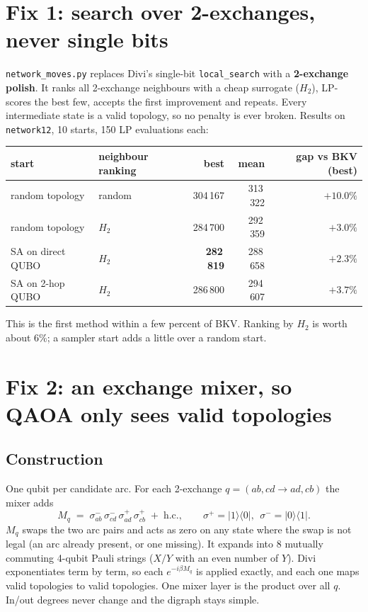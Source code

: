 \documentclass[11pt]{article}
\begin{document}
\section{Fix 1: search over 2-exchanges, never single bits}
\texttt{network\_moves.py} replaces Divi's single-bit \texttt{local\_search} with a
\textbf{2-exchange polish}. It ranks all 2-exchange neighbours with a cheap surrogate ($H_2$),
LP-scores the best few, accepts the first improvement and repeats. Every intermediate state
is a valid topology, so no penalty is ever broken. Results on \texttt{network12}, 10 starts,
150 LP evaluations each:
\begin{center}
\begin{tabular}{@{}llrrr@{}}
\toprule
start & neighbour ranking & best & mean & gap vs BKV (best)\\
\midrule
random topology & random & 304\,167 & 313\,322 & $+10.0\%$\\
random topology & $H_2$ & 284\,700 & 292\,359 & $+3.0\%$\\
SA on direct QUBO & $H_2$ & \textbf{282\,819} & 288\,658 & $\mathbf{+2.3\%}$\\
SA on 2-hop QUBO & $H_2$ & 286\,800 & 294\,607 & $+3.7\%$\\
\bottomrule
\end{tabular}
\end{center}
This is the first method within a few percent of BKV. Ranking by $H_2$ is worth about 6\%;
a sampler start adds a little over a random start.

\section{Fix 2: an exchange mixer, so QAOA only sees valid topologies}
\subsection{Construction}
One qubit per candidate arc. For each 2-exchange $q=(ab,cd\to ad,cb)$ the mixer adds
\[
  M_q \;=\; \sigma^-_{ab}\,\sigma^-_{cd}\,\sigma^+_{ad}\,\sigma^+_{cb} \;+\; \text{h.c.},
  \qquad \sigma^+=|1\rangle\langle0|,\ \ \sigma^-=|0\rangle\langle1| .
\]
$M_q$ swaps the two arc pairs and acts as zero on any state where the swap is not legal (an
arc already present, or one missing). It expands into 8 mutually commuting 4-qubit Pauli
strings ($X/Y$ with an even number of $Y$). Divi exponentiates term by term, so each
$e^{-i\beta M_q}$ is applied exactly, and each one maps valid topologies to valid
topologies. One mixer layer is the product over all $q$. In/out degrees never change and
the digraph stays simple.
\end{document}
